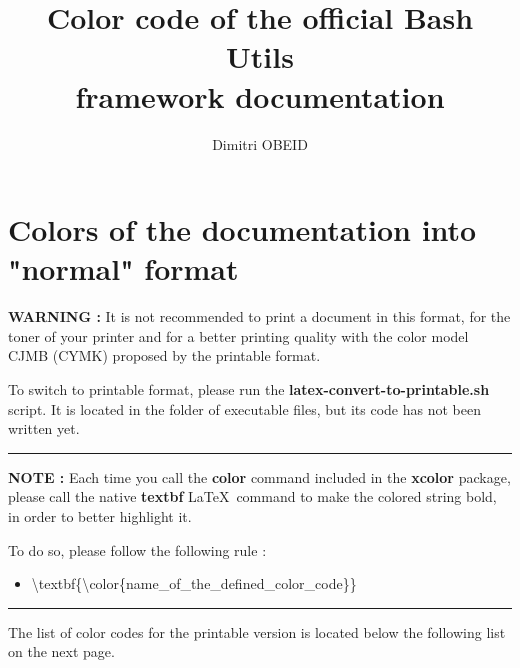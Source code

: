 \documentclass[a4paper,10pt]{article}
\title{\color{sec1}Color code of the official Bash Utils \\framework documentation}\color{text}
\author{Dimitri OBEID}
\begin{document}
\maketitle

\color{sec1}
\section{Colors of the documentation into "normal" format}\color{text}

\begin{justify}
  \textbf{\color{case}WARNING :} It is not recommended to print a document in this format, for the toner of your printer and for a better printing quality with the color model CJMB (CYMK) proposed by the printable format.

  To switch to printable format, please run the \textbf{\color{cmds}latex-convert-to-printable.sh} script. It is located in the folder of executable files, but its code has not been written yet.
\end{justify}

\color{text}\par\noindent\rule{\textwidth}{0.4pt}\color{text}

\begin{justify}
  \textbf{NOTE :} Each time you call the \textbf{color} command included in the \textbf{xcolor} package, please call the native \textbf{textbf} \LaTeX \ command to make the colored string bold, in order to better highlight it.
\end{justify}

\begin{justify}
  To do so, please follow the following rule :

  \begin{itemize}
    \item \textbackslash{textbf\{\textbackslash{color\{name\_of\_the\_defined\_color\_code}\}}\}
  \end{itemize}
\end{justify}

\color{text}\par\noindent\rule{\textwidth}{0.4pt}\color{text}

\begin{justify}
  The list of color codes for the printable version is located below the following list on the next page.
\end{justify}
\end{document}
